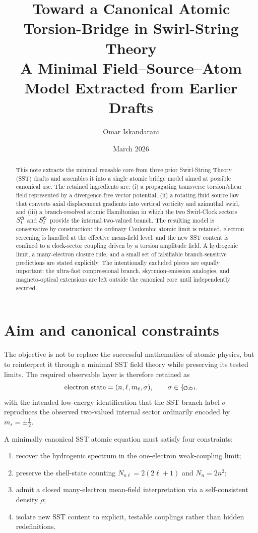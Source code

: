 \documentclass[11pt,a4paper]{article}
\title{Toward a Canonical Atomic Torsion-Bridge in Swirl-String Theory\\
\large A Minimal Field--Source--Atom Model Extracted from Earlier Drafts}
\author{Omar Iskandarani}
\date{March 2026}
\newcommand{\swirlarrow}{\mathchoice{\mkern-2mu\scriptstyle\boldsymbol{\circlearrowleft}}{\mkern-2mu\scriptstyle\boldsymbol{\circlearrowleft}}{\mkern-2mu\scriptscriptstyle\boldsymbol{\circlearrowleft}}{\mkern-2mu\scriptscriptstyle\boldsymbol{\circlearrowleft}}}
\newcommand{\swirlarrowcw}{\mathchoice{\mkern-2mu\scriptstyle\boldsymbol{\circlearrowright}}{\mkern-2mu\scriptstyle\boldsymbol{\circlearrowright}}{\mkern-2mu\scriptscriptstyle\boldsymbol{\circlearrowright}}{\mkern-2mu\scriptscriptstyle\boldsymbol{\circlearrowright}}}
\newcommand{\SwirlClock}{S_t^{\swirlarrow}}
\newcommand{\SwirlClockcw}{S_t^{\swirlarrowcw}}
\begin{document}
\maketitle

\begin{abstract}
This note extracts the minimal reusable core from three prior Swirl-String Theory (SST) drafts and assembles it into a single atomic bridge model aimed at possible canonical use. The retained ingredients are: (i) a propagating transverse torsion/shear field represented by a divergence-free vector potential, (ii) a rotating-fluid source law that converts axial displacement gradients into vertical vorticity and azimuthal swirl, and (iii) a branch-resolved atomic Hamiltonian in which the two Swirl-Clock sectors $\SwirlClock$ and $\SwirlClockcw$ provide the internal two-valued branch. The resulting model is conservative by construction: the ordinary Coulombic atomic limit is retained, electron screening is handled at the effective mean-field level, and the new SST content is confined to a clock-sector coupling driven by a torsion amplitude field. A hydrogenic limit, a many-electron closure rule, and a small set of falsifiable branch-sensitive predictions are stated explicitly. The intentionally excluded pieces are equally important: the ultra-fast compressional branch, skyrmion-emission analogies, and magneto-optical extensions are left outside the canonical core until independently secured.
\end{abstract}

\section{Aim and canonical constraints}
The objective is not to replace the successful mathematics of atomic physics, but to reinterpret it through a minimal SST field theory while preserving its tested limits. The required observable layer is therefore retained as
\begin{equation}
\label{eq:state-labels}
\text{electron state}=(n,\ell,m_\ell,\sigma),
\qquad
\sigma\in\{\swirlarrow,\swirlarrowcw\},
\end{equation}
with the intended low-energy identification that the SST branch label $\sigma$ reproduces the observed two-valued internal sector ordinarily encoded by $m_s=\pm \tfrac12$.

A minimally canonical SST atomic equation must satisfy four constraints:
\begin{enumerate}[label=(C\arabic*)]
    \item recover the hydrogenic spectrum in the one-electron weak-coupling limit;
    \item preserve the shell-state counting $N_{n\ell}=2(2\ell+1)$ and $N_n=2n^2$;
    \item admit a closed many-electron mean-field interpretation via a self-consistent density $\rho$;
    \item isolate new SST content to explicit, testable couplings rather than hidden redefinitions.
\end{enumerate}
\end{document}
